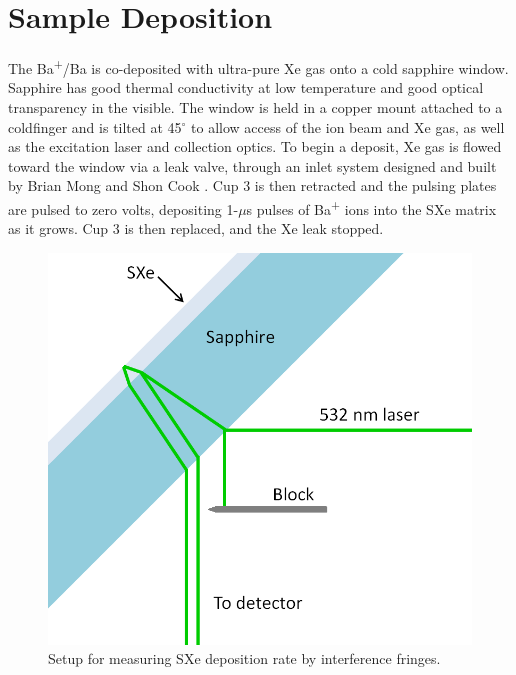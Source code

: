 
\section{Sample Deposition}
\label{sec:deposition}

The Ba\textsuperscript{+}/Ba is co-deposited with ultra-pure Xe gas onto a cold sapphire window.  Sapphire has good thermal conductivity at low temperature and good optical transparency in the visible.  The window is held in a copper mount attached to a coldfinger and is tilted at 45$^{\circ}$ to allow access of the ion beam and Xe gas, as well as the excitation laser and collection optics.  To begin a deposit, Xe gas is flowed toward the window via a leak valve, through an inlet system designed and built by Brian Mong and Shon Cook \cite{Brian,Shon}.  Cup 3 is then retracted and the pulsing plates are pulsed to zero volts, depositing 1-$\mu$s pulses of Ba\textsuperscript{+} ions into the SXe matrix as it grows.  Cup 3 is then replaced, and the Xe leak stopped.

\begin{figure} %
        \centering
                \includegraphics[width=.4\textwidth]{figures/fringe_setup.png}
                \caption{Setup for measuring SXe deposition rate by interference fringes.}
\label{fig:fringe_setup}
\end{figure}

